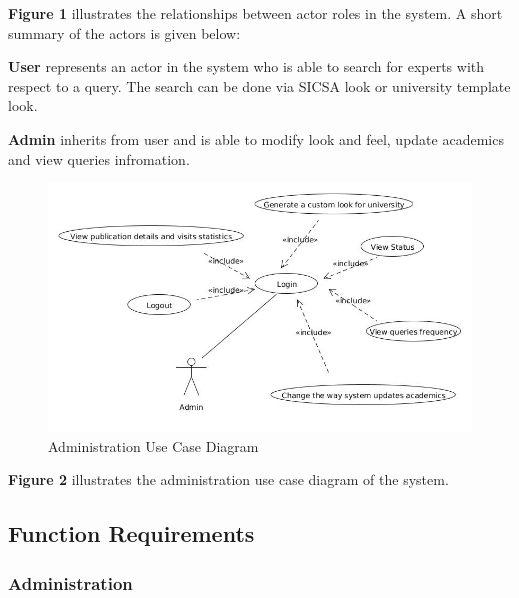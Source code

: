 \textbf{Figure 1} illustrates the relationships between actor roles in the system. A short summary of the actors is given below:

\textbf{User} represents an actor in the system who is able to search for experts with respect to a query. The search can be done via SICSA look
or university template look.

\textbf{Admin} inherits from user and is able to modify look and feel, update academics and view queries infromation.

\begin{figure}
\centering
\includegraphics[scale=0.4]{./figures/use_case.jpg}
\caption{Administration Use Case Diagram}
\end{figure}

\textbf{Figure 2} illustrates the administration use case diagram of the system.

\subsection{Function Requirements}

\subsubsection{Administration}


